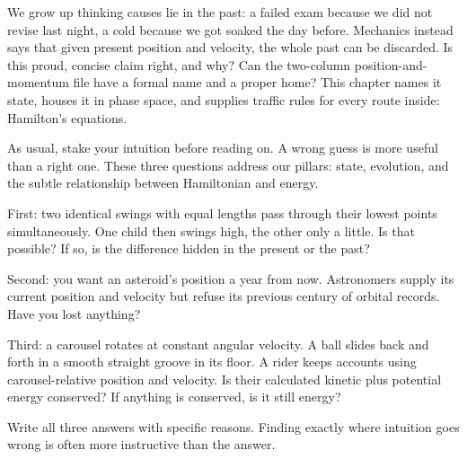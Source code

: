 \begin{mainline}
We grow up thinking causes lie in the past: a failed exam because we did not revise last night, a cold because we got soaked the day before. Mechanics instead says that given present position and velocity, the whole past can be discarded. Is this proud, concise claim right, and why? Can the two-column position-and-momentum file have a formal name and a proper home? This chapter names it state, houses it in phase space, and supplies traffic rules for every route inside: Hamilton's equations.
\end{mainline}


As usual, stake your intuition before reading on. A wrong guess is more useful than a right one. These three questions address our pillars: state, evolution, and the subtle relationship between Hamiltonian and energy.

First: two identical swings with equal lengths pass through their lowest points simultaneously. One child then swings high, the other only a little. Is that possible? If so, is the difference hidden in the present or the past?

Second: you want an asteroid's position a year from now. Astronomers supply its current position and velocity but refuse its previous century of orbital records. Have you lost anything?

Third: a carousel rotates at constant angular velocity. A ball slides back and forth in a smooth straight groove in its floor. A rider keeps accounts using carousel-relative position and velocity. Is their calculated kinetic plus potential energy conserved? If anything is conserved, is it still energy?

Write all three answers with specific reasons. Finding exactly where intuition goes wrong is often more instructive than the answer.



